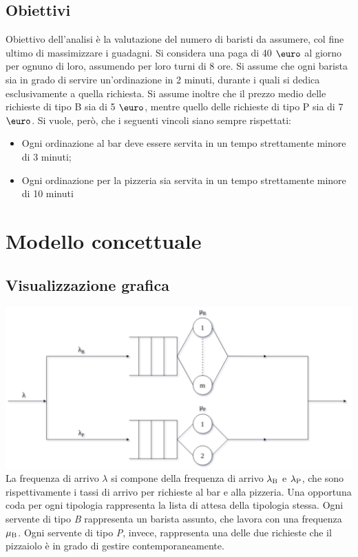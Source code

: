 \documentclass[a4paper, 12pt]{article}
\begin{document}
\bigskip

\subsection{Obiettivi}
Obiettivo dell'analisi è la valutazione del numero di baristi da
assumere, col fine ultimo di massimizzare i guadagni. Si considera una paga di 40 $\mbox{\euro}$ al giorno per ognuno di loro, assumendo per loro turni di 8 ore. Si assume che ogni barista sia in grado di servire un'ordinazione in 2 minuti, durante i quali si dedica esclusivamente a quella richiesta. Si assume inoltre che il prezzo medio delle richieste di tipo B sia di 5 $\mbox{\euro}$, mentre quello delle richieste di tipo P sia di 7 $\mbox{\euro}$. Si vuole, però, che i seguenti vincoli siano sempre rispettati:
\begin{itemize}
  \item Ogni ordinazione al bar deve essere servita in un tempo strettamente minore di 3 minuti;
  \item Ogni ordinazione per la pizzeria sia servita in un tempo strettamente minore di 10 minuti 
\end{itemize}

\newpage
\section{Modello concettuale}
\subsection{Visualizzazione grafica}
	\includegraphics[width=\textwidth]{conceptual_model}
La frequenza di arrivo $\lambda$ si compone della frequenza di arrivo
$\lambda\textsubscript{B}$ e $\lambda\textsubscript{P}$, che sono rispettivamente i tassi di arrivo per richieste al bar e alla pizzeria. Una opportuna coda per ogni tipologia rappresenta la lista di attesa della tipologia stessa. Ogni servente di tipo \emph{B} rappresenta un barista assunto, che lavora con una frequenza $\mu\textsubscript{B}$. Ogni servente di tipo \emph{P}, invece, rappresenta una delle due richieste che il pizzaiolo è in grado di gestire contemporaneamente.
\end{document}
